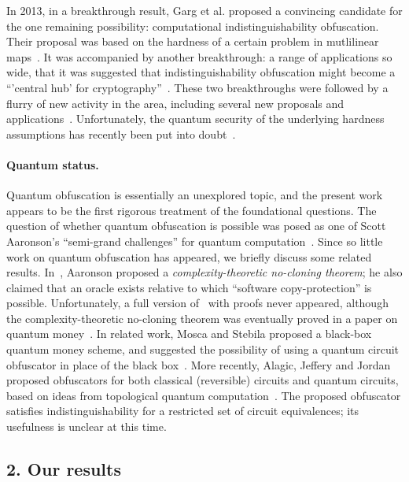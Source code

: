 \documentclass[11pt]{article}
\numberwithin{equation}{section}
\begin{document}
{In 2013, in a breakthrough result, Garg et al. proposed a convincing candidate for the one remaining possibility: computational indistinguishability obfuscation. Their proposal was based on the hardness of a certain problem in mutlilinear maps~\cite{GGHRSW13}. It was accompanied by another breakthrough: a range of applications so wide, that it was suggested that indistinguishability obfuscation might become a ``'central hub' for cryptography''~\cite{SW14}. These two breakthroughs were followed by a flurry of new activity in the area, including several new proposals and applications~\cite{BGKPS14, BCCGKPR14, BZ14, BR14, GGHW14, HSW14}. Unfortunately, the quantum security of the underlying hardness assumptions has recently been put into doubt~\cite{Pei15}.

\paragraph{Quantum status.} Quantum obfuscation is essentially an unexplored topic, and the present work appears to be the first rigorous treatment of the foundational questions. The question of whether quantum obfuscation is possible was posed as one of Scott Aaronson's ``semi-grand challenges'' for quantum computation~\cite{Aar05}. Since so little work on quantum obfuscation has appeared, we briefly discuss some related results. In~\cite{Aar09}, Aaronson proposed a \emph{complexity-theoretic no-cloning theorem}; he also claimed that an oracle exists relative to which ``software copy-protection'' is possible. Unfortunately, a full version of~\cite{Aar09} with proofs never appeared, although the complexity-theoretic no-cloning theorem was eventually proved in a paper on quantum money~\cite{AC12}. In related work, Mosca and Stebila proposed a black-box quantum money scheme, and suggested the possibility of using a quantum circuit obfuscator in place of the black box~\cite{MS10}. More recently, Alagic, Jeffery and Jordan proposed obfuscators for both classical (reversible) circuits and quantum circuits, based on ideas from topological quantum computation~\cite{ASS14}. The proposed obfuscator satisfies indistinguishability for a restricted set of circuit equivalences; its usefulness is unclear at this time.

\subsection*{2. Our results}\label{sec:intro}

}
\end{document}

